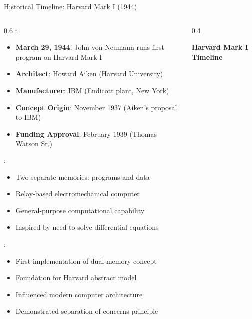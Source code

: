 \begin{frame}{Historical Timeline: Harvard Mark I (1944)}
\begin{columns}
\begin{column}{0.6\textwidth}
:
\begin{itemize}
\item \textbf{March 29, 1944}: John von Neumann runs first program on Harvard Mark I
\item \textbf{Architect}: Howard Aiken (Harvard University)
\item \textbf{Manufacturer}: IBM (Endicott plant, New York)
\item \textbf{Concept Origin}: November 1937 (Aiken's proposal to IBM)
\item \textbf{Funding Approval}: February 1939 (Thomas Watson Sr.)
\end{itemize}

\vspace{0.3cm}
:
\begin{itemize}
\item Two separate memories: programs and data
\item Relay-based electromechanical computer
\item General-purpose computational capability
\item Inspired by need to solve differential equations
\end{itemize}

\vspace{0.3cm}
:
\begin{itemize}
\item First implementation of dual-memory concept
\item Foundation for Harvard abstract model
\item Influenced modern computer architecture
\item Demonstrated separation of concerns principle
\end{itemize}
\end{column}
\begin{column}{0.4\textwidth}
\begin{center}
\textbf{Harvard Mark I Timeline}
\vspace{0.3cm}

\end{center}
\end{column}
\end{columns}
\end{frame}

